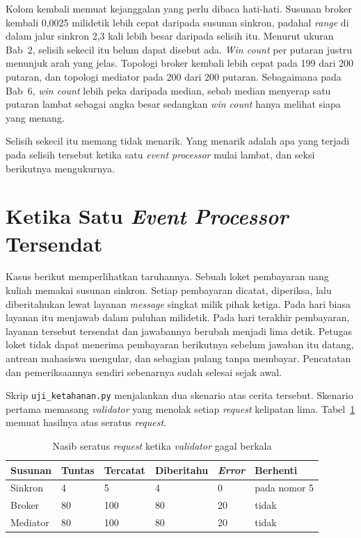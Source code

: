Kolom kembali memuat kejanggalan yang perlu dibaca hati-hati. Susunan broker
kembali 0,0025 milidetik lebih cepat daripada susunan sinkron, padahal
\textit{range} di dalam jalur sinkron 2,3 kali lebih besar daripada selisih
itu. Menurut ukuran Bab~2, selisih sekecil itu belum dapat disebut ada.
\textit{Win count} per putaran justru menunjuk arah yang jelas. Topologi broker kembali
lebih cepat pada 199 dari 200 putaran, dan topologi mediator pada 200 dari 200
putaran. Sebagaimana pada Bab~6,
\textit{win count} lebih peka daripada median, sebab median menyerap satu putaran
lambat sebagai angka besar sedangkan \textit{win count} hanya melihat siapa yang
menang.

Selisih sekecil itu memang tidak menarik. Yang menarik adalah apa yang terjadi
pada selisih tersebut ketika satu \textit{event processor} mulai lambat, dan seksi berikutnya
mengukurnya.

\section{Ketika Satu \textit{Event Processor} Tersendat}

Kasus berikut memperlihatkan taruhannya. Sebuah loket pembayaran uang kuliah
memakai susunan sinkron. Setiap pembayaran dicatat, diperiksa, lalu
diberitahukan lewat layanan \textit{message} singkat milik pihak ketiga. Pada hari biasa
layanan itu menjawab dalam puluhan milidetik. Pada hari terakhir pembayaran,
layanan tersebut tersendat dan jawabannya berubah menjadi lima detik. Petugas
loket tidak dapat menerima pembayaran berikutnya sebelum jawaban itu datang,
antrean mahasiswa mengular, dan sebagian pulang tanpa membayar. Pencatatan dan
pemeriksaannya sendiri sebenarnya sudah selesai sejak awal.

Skrip \texttt{uji\_ketahanan.py} menjalankan dua skenario atas cerita tersebut.
Skenario pertama memasang \textit{validator} yang menolak setiap \textit{request} kelipatan
lima. Tabel~\ref{tab:gagal} memuat hasilnya atas seratus \textit{request}.

\begin{table}[htbp]
  \centering
  \caption{Nasib seratus \textit{request} ketika \textit{validator} gagal berkala}
  \label{tab:gagal}
  \begin{tabularx}{\textwidth}{|l|l|l|l|l|X|}
    \hline
    \textbf{Susunan} & \textbf{Tuntas} & \textbf{Tercatat} & \textbf{Diberitahu} & \textbf{\textit{Error}} & \textbf{Berhenti} \\
    \hline
    Sinkron & 4 & 5 & 4 & 0 & pada nomor 5 \\
    \hline
    Broker & 80 & 100 & 80 & 20 & tidak \\
    \hline
    Mediator & 80 & 100 & 80 & 20 & tidak \\
    \hline
  \end{tabularx}
\end{table}


